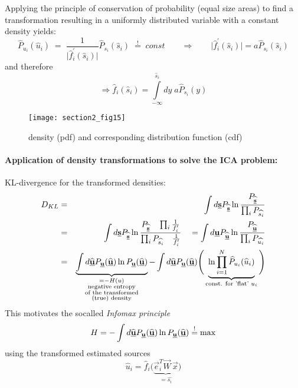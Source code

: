 Applying the principle of conservation of probability (equal size
areas) to find a transformation resulting in a uniformly distributed
variable with a constant density yields: 
\begin{equation}
  \label{eq:1}
		\widehat{P}_{u_i} (\widehat{u}_i) \; = \;   
		 \frac{1}{\big| \widehat{f}_i^{'} (\widehat{s}_i) \big|} 
		\widehat{P}_{s_i}(\widehat{s}_i) \; \stackrel{!}{=} \; const \qquad \Rightarrow \qquad 
		 \big| \widehat{f}_i^{'} (\widehat{s}_i) \big| =  a \widehat{P}_{s_i}(\widehat{s}_i) 
\end{equation}
and therefore
\begin{equation}
\Rightarrow \widehat{f}_i (\widehat{s}_i)
 = \int\limits_{-\infty}^{\widehat{s}_i} dy\; a 
			\widehat{P}_{s_i}(y)
\end{equation}

\begin{figure}[h]
  \centering
  \texttt{[image: section2\_fig15]}  
  \caption{density (pdf) and corresponding distribution function (cdf)}
  \label{fig:cdf}
\end{figure}

\paragraph{Application of density transformations to solve the ICA problem:}
\label{sec:appl-dens-transf}
KL-divergence for the transformed densities:
\begin{eqnarray}
  D_{KL} & = & \int d \underline{\mathbf{s}} P_{\widehat{\underline{\mathbf{s}}}} \ln \frac{P_{\widehat{\underline{\mathbf{s}}}}}{\prod_i P_{\widehat{s_i}}}\\
  & = &  \int d \underline{\mathbf{s}} P_{\widehat{\underline{\mathbf{s}}}} \ln \frac{P_{\widehat{\underline{\mathbf{s}}}} \quad \prod_i \frac{1}{f_i'}}{\prod_i  P_{\widehat{s_i}} \quad \frac{1}{f_i'}}
  \quad = \int d \underline{\mathbf{u}} P_{\widehat{\underline{\mathbf{u}}}} \ln \frac{P_{\widehat{\underline{\mathbf{u}}}}}{\prod_i  P_{\widehat{u_i}}} \\
  & = &  \underbrace{ \int d \widehat{\underline{\mathbf{u}}} P_{\underline{\mathbf{u}}}
    (\widehat{\underline{\mathbf{u}}}) \ln P_{\underline{\mathbf{u}}}(\widehat{\underline{\mathbf{u}}}) }_{
    \substack{ = -H(u) \\ \text{negative entropy} \\
      \text{of the transformed} \\
      \text{(true) density}} }
  -\int d \widehat{\underline{\mathbf{u}}} P_{\underline{\mathbf{u}}}
  (\widehat{\underline{\mathbf{u}}}) \Bigg(\underbrace{ \ln \prod\limits_{i = 1}^N
    \widehat{P}_{u_i} (\widehat{u}_i)}_{
    \text{const. for 'flat' $u_i$} }\Bigg) 
\end{eqnarray}
This motivates the socalled \emph{Infomax principle} \parencite{BellSejnowski1995}
\begin{equation}\label{eq:infomax}
  H = -\int d \widehat{\underline{\mathbf{u}}} P_{\underline{\mathbf{u}}} (\widehat{\underline{\mathbf{u}}})
  \ln P_{\underline{\mathbf{u}}} (\widehat{\underline{\mathbf{u}}}) \stackrel{\mathrm{!}}{=} \max 
\end{equation}
using the transformed estimated sources
\begin{equation}
\widehat{u}_i = \widehat{f}_i \big( \underbrace{ \vec{e}_i^T
		\vec{W} \, \vec{x}  }_{= \widehat{s_i} } \big) 
\end{equation}

